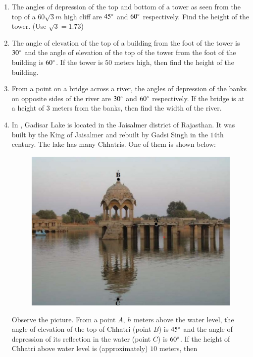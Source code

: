 \begin{enumerate}[label=\thesubsection.\arabic*.,ref=\thesubsection.\theenumi]
\begin{figure}[H]
        \caption{}
        \label{fig:as.jpeg}
    \end{figure}
\item The angles of depression of the top and bottom of a tower as seen from the top of a $60\sqrt{3}m$ high cliff are $45\degree$ and $60\degree$ respectively. Find the height of the tower. (Use $\sqrt{3}=1.73$)
    \hfill{}\item The angle of elevation of the top of a building from the foot of the tower is $30\degree$ and the angle of elevation of the top of the tower from the foot of the building is $60\degree$. If the tower is $50$ meters high, then find the height of the building.
    \hfill{}\item From a point on a bridge across a river, the angles of depression of the banks on opposite sides of the river are $30\degree$ and $60\degree$ respectively. If the bridge is at a height of $3$ meters from the banks, then find the width of the river. 
    \hfill{}\item In , Gadisar Lake is located in the Jaisalmer district of Rajasthan. It was built by the King of Jaisalmer and rebuilt by Gadsi Singh in the $14$th century. The lake has many Chhatris. One of them is shown below:
    \begin{figure}[H]
        \centering
    	 \includegraphics[width=\columnwidth]{cbse/figs/ak.jpeg}
        \caption{}
        \label{fig:ak}
    \end{figure}
    Observe the picture. From a point $A$, $h$ meters above the water level, the angle of elevation of the top of Chhatri (point $B$) is $45\degree$ and the angle of depression of its reflection in the water (point $C$) is $60\degree$. If the height of Chhatri above water level is (approximately) $10$ meters, then 

\end{enumerate}
